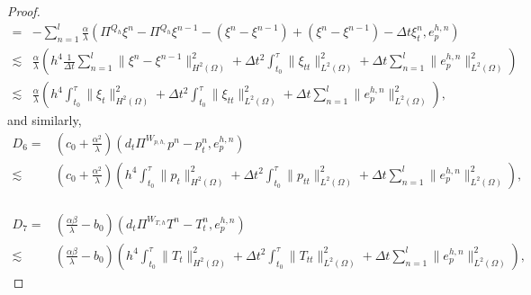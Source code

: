 \documentclass{article}
\numberwithin{equation}{section}
\begin{document}
\begin{proof}
\begin{equation*}
\begin{aligned}
 =&-\sum_{n=1}^l\frac\alpha\lambda( \Pi^{Q_h} \xi^n-\Pi^{Q_h} \xi^{n-1}-(\xi^n-\xi^{n-1})
         +(\xi^n-\xi^{n-1})-\Delta t \xi_t^n , e_p^{h,n})\\
  \lesssim&
   \frac\alpha\lambda(h^4
     \frac{1}{\Delta t} \sum_{n=1}^l     \| \xi^n-\xi^{n-1}  \|_{H^2(\Omega)}^2
   + \Delta t^2  \int_{t_0}^{\tau}\| \xi_{tt}  \|_{L^2(\Omega)}^2
    + \Delta t \sum_{n=1}^l        \| e_{p}^{h,n} \|_{L^2(\Omega)}^2
   )    \\    
  \lesssim&
   \frac\alpha\lambda(h^4
    \int_{t_0}^{\tau}\| \xi_t  \|_{H^2(\Omega)}^2
   + \Delta t^2  \int_{t_0}^{\tau}\| \xi_{tt}  \|_{L^2(\Omega)}^2
    + \Delta t \sum_{n=1}^l        \| e_{p}^{h,n} \|_{L^2(\Omega)}^2
   ),                           
\end{aligned}
\end{equation*} 
and similarly,
  \begin{equation*}    
\begin{aligned}  
 D_6= & 
   (c_0+\frac{\alpha^2}{\lambda})(d_t\Pi^{W_{p,h,}}p^n- p_t^n , e_p^{h,n})    \\
   \lesssim&
    (c_0+\frac{\alpha^2}{\lambda})(h^4
    \int_{t_0}^{\tau}\| p_t  \|_{H^2(\Omega)}^2
   + \Delta t^2  \int_{t_0}^{\tau}\| p_{tt}  \|_{L^2(\Omega)}^2
    + \Delta t \sum_{n=1}^l        \| e_{p}^{h,n} \|_{L^2(\Omega)}^2
   ), \\                                  
\end{aligned}
\end{equation*} 

  \begin{equation*}    
\begin{aligned}  
 D_7=&  (\frac{\alpha\beta}{\lambda}-b_0)(d_t\Pi^{W_{T,h}}T^n - T_t^n, e_p^{h,n})  \\
 \lesssim&
   (\frac{\alpha\beta}{\lambda}-b_0)(h^4
    \int_{t_0}^{\tau}\| T_t  \|_{H^2(\Omega)}^2
   + \Delta t^2  \int_{t_0}^{\tau}\| T_{tt}  \|_{L^2(\Omega)}^2
    + \Delta t \sum_{n=1}^l        \| e_{p}^{h,n} \|_{L^2(\Omega)}^2
   ),
\end{aligned}
\end{equation*} 


\end{proof}
\end{document}
